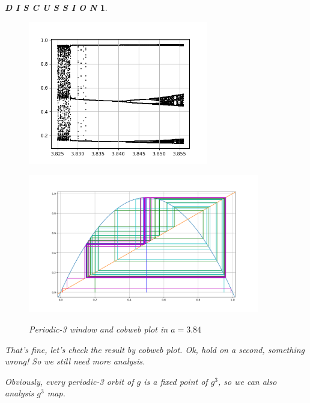 \documentclass[12pt]{article}
\theoremstyle{plain}
\newtheorem{discussion}{\textit{D I S C U S S I O N}}[section]
\begin{document}
\begin{discussion}
\begin{figure}[H]
\begin{minipage}[c][0.5\width]{
   0.5\textwidth}
   \centering
   \includegraphics[width=0.70\textwidth]{figure/section1/periodic-3-window.png}
\end{minipage}
\begin{minipage}[c][0.5\width]{
   0.5\textwidth}
   \centering
   \includegraphics[width=0.9\textwidth]{figure/section1/logistic384.png} \\
\end{minipage}
\caption{Periodic-3 window and cobweb plot in $a = 3.84$}\label{logistic-cobweb-plot1}
\end{figure}

That's fine, let's check the result by cobweb plot. Ok, hold on a second, something wrong! So we still need more analysis.

Obviously, every periodic-3 orbit of $g$ is a fixed point of $g^3$, so we can also analysis $g^3$ map.\\[3ex]


\end{discussion}
\end{document}
